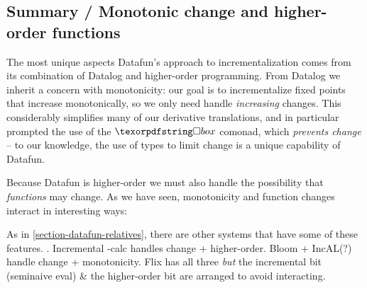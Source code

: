 
\subsection{Summary / Monotonic change and higher-order functions}

%
The most unique aspects Datafun's approach to incrementalization comes from its
combination of Datalog and higher-order programming. From Datalog we inherit a
concern with monotonicity: our goal is to incrementalize fixed points that increase monotonically, so we only need handle \emph{increasing} changes.
%
This considerably simplifies many of our derivative translations, and in
particular prompted the use of the $\iso$ comonad, which \emph{prevents change}
-- to our knowledge, the use of types to limit change is a unique capability of
Datafun.

Because Datafun is higher-order we must also handle the possibility that \emph{functions} may change. As we have seen, monotonicity and function changes interact in interesting ways: \XXX

As in \cref{section-datafun-relatives}, there are other systems that have some of these features. \XXX. Incremental \fn-calc handles change + higher-order. Bloom + IncAL(?) handle change + monotonicity. Flix has all three \emph{but} the incremental bit (seminaive eval) \& the higher-order bit are arranged to avoid interacting.


\section{}

